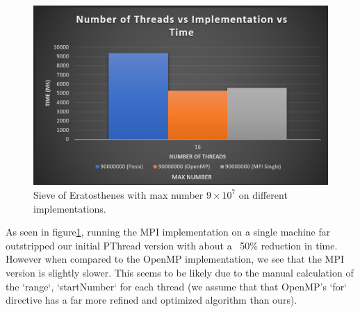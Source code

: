 \begin{figure}
  \centering
  \includegraphics[width=\linewidth]{Figures/mpi_SINGLE.png}
  \caption{Sieve of Eratosthenes with max number $9\times10^7$ on different
  implementations.}
  \label{fig:sievesingle}
\end{figure}

As seen in figure\ref{fig:sievesingle}, running the MPI implementation on a single machine far 
outstripped our initial PThread version with about a ~50\% reduction in time.
However when compared to the OpenMP implementation, we see that the MPI version 
is slightly slower. This seems to be likely due to the manual calculation of the 
`range`, `startNumber` for each thread (we assume that that OpenMP's `for` 
directive has a far more refined and optimized algorithm than ours).
